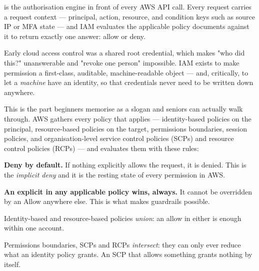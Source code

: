   is the authorisation engine in front of every AWS API call. Every request carries a request context --- principal, action, resource, and condition keys such as source IP or MFA state --- and IAM evaluates the applicable policy documents against it to return exactly one answer: allow or deny.

 Early cloud access control was a shared root credential, which makes "who did this?" unanswerable and "revoke one person" impossible. IAM exists to make permission a first-class, auditable, machine-readable object --- and, critically, to let a \emph{machine} have an identity, so that credentials never need to be written down anywhere.

 This is the part beginners memorise as a slogan and seniors can actually walk through. AWS gathers every policy that applies --- identity-based policies on the principal, resource-based policies on the target, permissions boundaries, session policies, and organisation-level service control policies (SCPs) and resource control policies (RCPs) --- and evaluates them with these rules:

\begin{wbitem}
  \item \textbf{Deny by default.} If nothing explicitly allows the request, it is denied. This is the \emph{implicit deny} and it is the resting state of every permission in AWS.
  \item \textbf{An explicit  in any applicable policy wins, always.} It cannot be overridden by an Allow anywhere else. This is what makes guardrails possible.
  \item Identity-based and resource-based policies \emph{union}: an allow in either is enough within one account.
  \item Permissions boundaries, SCPs and RCPs \emph{intersect}: they can only ever reduce what an identity policy grants. An SCP that allows something grants nothing by itself.
\end{wbitem}

